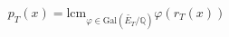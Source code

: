 \documentclass[preview]{standalone}
\begin{document}
\begin{center}
\begin{equation*}p_T(x) = \text{lcm}_{\varphi \in \text{Gal}\left(\widetilde{E_T}/\mathbb{Q}\right)} \varphi(r_T(x))\end{equation*}
\end{center}
\end{document}
